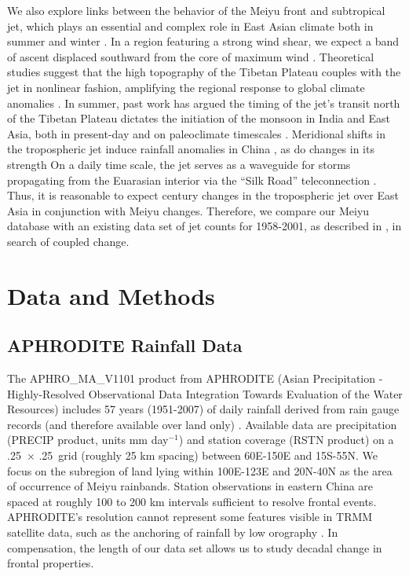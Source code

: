 \documentclass[draft,grl]{AGUTeX}
\begin{document}
\begin{article}
	We also explore links between the behavior of the Meiyu front and subtropical jet, which plays an essential and complex role in East Asian climate both in summer and winter \citep{Yang2002}. In a region featuring a strong wind shear, we expect a band of ascent displaced southward from the core of maximum wind \citep{Holton2004}. Theoretical studies suggest that the high topography of the Tibetan Plateau couples with the jet in nonlinear fashion, amplifying the regional response to global climate anomalies \citep{Nigam1989,Broccoli1992,Park1997}. In summer, past work has argued the timing of the jet's transit north of the Tibetan Plateau dictates the initiation of the monsoon in India and East Asia, both in present-day \citep{Yin1949,Yeh1959,Hahn1975} and on paleoclimate timescales \citep{Nagashima2011,Nagashima2013,Chiang2015}. Meridional shifts in the tropospheric jet induce rainfall anomalies in China \citep{Liang1998}, as do changes in its strength \citep{Kwon2007,Du2009,Li2014} On a daily time scale, the jet serves as a waveguide for storms propagating from the Euarasian interior via the ``Silk Road'' teleconnection \citep{Hoskins1993,Ambrizzi1997,Kosaka2012}. Thus, it is reasonable to expect  century changes in the tropospheric jet over East Asia in conjunction with Meiyu changes. Therefore, we compare our Meiyu database with an existing data set of jet counts for 1958-2001, as described in \citet{Schiemann2009}, in search of coupled change.
	
\section{Data and Methods}

\subsection{APHRODITE Rainfall Data}

	The APHRO\_MA\_V1101 product from APHRODITE (Asian Precipitation - Highly-Resolved Observational Data Integration Towards Evaluation of the Water Resources) includes 57 years (1951-2007) of daily  rainfall derived from rain gauge records (and therefore available over land only) \citep{Yatagai2012} . Available data are precipitation (PRECIP product, units mm day$^{-1}$) and station coverage (RSTN product) on a .25\textdegree\ $\times$ .25\textdegree\ grid (roughly 25 km spacing) between 60\textdegree E-150\textdegree E and 15\textdegree S-55\textdegree N. We focus on the subregion of land lying within 100\textdegree E-123\textdegree E and 20\textdegree N-40\textdegree N as the area of occurrence of Meiyu rainbands. Station observations in eastern China are spaced at roughly 100 to 200 km intervals sufficient to resolve frontal events. APHRODITE's resolution cannot represent some features visible in TRMM satellite data, such as the anchoring of rainfall by low orography \citep{Xu2009}. In compensation, the length of our data set allows us to study decadal change in frontal properties. 
	

\end{article}
\end{document}
